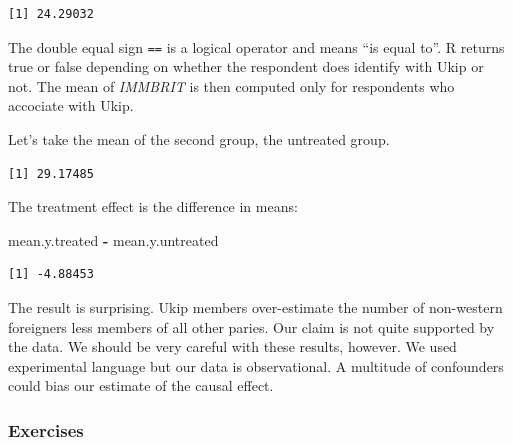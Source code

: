 \documentclass[]{article}
\newenvironment{Shaded}{\begin{snugshade}}{\end{snugshade}}
\newcommand{\KeywordTok}[1]{\textcolor[rgb]{0.13,0.29,0.53}{\textbf{#1}}}
\newcommand{\DecValTok}[1]{\textcolor[rgb]{0.00,0.00,0.81}{#1}}
\newcommand{\StringTok}[1]{\textcolor[rgb]{0.31,0.60,0.02}{#1}}
\newcommand{\OperatorTok}[1]{\textcolor[rgb]{0.81,0.36,0.00}{\textbf{#1}}}
\newcommand{\NormalTok}[1]{#1}
\theoremstyle{definition}
\theoremstyle{definition}
\theoremstyle{definition}
\theoremstyle{remark}
\begin{document}
\begin{verbatim}
[1] 24.29032
\end{verbatim}

The double equal sign \texttt{==} is a logical operator and means ``is
equal to''. R returns true or false depending on whether the respondent
does identify with Ukip or not. The mean of \emph{IMMBRIT} is then
computed only for respondents who accociate with Ukip.

Let's take the mean of the second group, the untreated group.

\begin{Shaded}
\end{Shaded}

\begin{verbatim}
[1] 29.17485
\end{verbatim}

The treatment effect is the difference in means:

\begin{Shaded}
\begin{Highlighting}[]
\NormalTok{mean.y.treated }\OperatorTok{-}\StringTok{ }\NormalTok{mean.y.untreated}
\end{Highlighting}
\end{Shaded}

\begin{verbatim}
[1] -4.88453
\end{verbatim}

The result is surprising. Ukip members over-estimate the number of
non-western foreigners less members of all other paries. Our claim is
not quite supported by the data. We should be very careful with these
results, however. We used experimental language but our data is
observational. A multitude of confounders could bias our estimate of the
causal effect.

\subsubsection{Exercises}\label{exercises-1}
\end{document}
